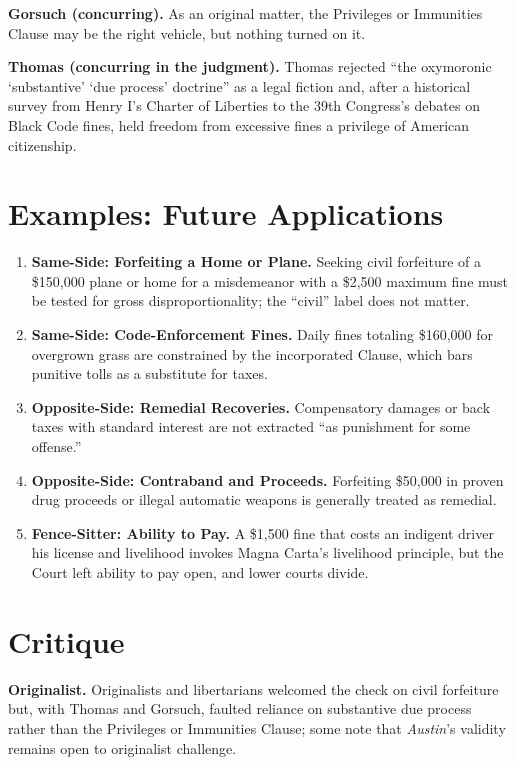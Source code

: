 \documentclass[12pt]{article}
\begin{document}
\textbf{Gorsuch (concurring).} As an original matter, the Privileges or Immunities Clause may be the right vehicle, but nothing turned on it.

\textbf{Thomas (concurring in the judgment).} Thomas rejected ``the oxymoronic `substantive' `due process' doctrine'' as a legal fiction and, after a historical survey from Henry I's Charter of Liberties to the 39th Congress's debates on Black Code fines, held freedom from excessive fines a privilege of American citizenship.

\section{Examples: Future Applications}

\begin{enumerate}
\item \textbf{Same-Side: Forfeiting a Home or Plane.} Seeking civil forfeiture of a \$150,000 plane or home for a misdemeanor with a \$2,500 maximum fine must be tested for gross disproportionality; the ``civil'' label does not matter.
\item \textbf{Same-Side: Code-Enforcement Fines.} Daily fines totaling \$160,000 for overgrown grass are constrained by the incorporated Clause, which bars punitive tolls as a substitute for taxes.
\item \textbf{Opposite-Side: Remedial Recoveries.} Compensatory damages or back taxes with standard interest are not extracted ``as punishment for some offense.''
\item \textbf{Opposite-Side: Contraband and Proceeds.} Forfeiting \$50,000 in proven drug proceeds or illegal automatic weapons is generally treated as remedial.
\item \textbf{Fence-Sitter: Ability to Pay.} A \$1,500 fine that costs an indigent driver his license and livelihood invokes Magna Carta's livelihood principle, but the Court left ability to pay open, and lower courts divide.
\end{enumerate}

\section{Critique}

\textbf{Originalist.} Originalists and libertarians welcomed the check on civil forfeiture but, with Thomas and Gorsuch, faulted reliance on substantive due process rather than the Privileges or Immunities Clause; some note that \textit{Austin}'s validity remains open to originalist challenge.
\end{document}
